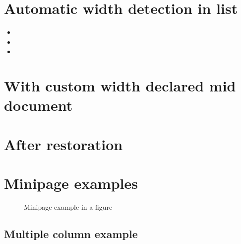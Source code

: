 \documentclass{article}
\begin{document}
\section{Automatic width detection in list}

\lipsum[1][1-3]
\notebox{\lipsum[1][3-6]}
\lipsum[1][6-9]

\begin{itemize}
\item \lipsum[2][1-3]
\item \lipsum[2][3-6]\notebox{\lipsum[2][6-9]}
\item \lipsum[2][9-12]
\end{itemize}

\lipsum[3][1-3]
\notebox{\lipsum[3][3-6]}
\lipsum[3][6-9]

\section{With custom width declared mid document}

\setlength{\aweboxcontentwidth}{0.45\linewidth}

\lipsum[4][1-3]
\notebox{\lipsum[4][3-6]}
\lipsum[4][6-9]

\section{After restoration}

\setlength{\aweboxcontentwidth}{0.88\linewidth}

\lipsum[5][1-3]
\notebox{\lipsum[5][3-6]}
\lipsum[5][6-9]

\section{Minipage examples}


\begin{figure}[h!]
  \centering
  \caption{Minipage example in a figure}
  \label{fig:minipageex}
\end{figure}

\clearpage

\begin{multicols}{2}
  \section{Multiple column example}
  \lipsum[1]

  \notebox{\lipsum[2][1-3]}

  \lipsum[3-7]
\end{multicols}
\end{document}
